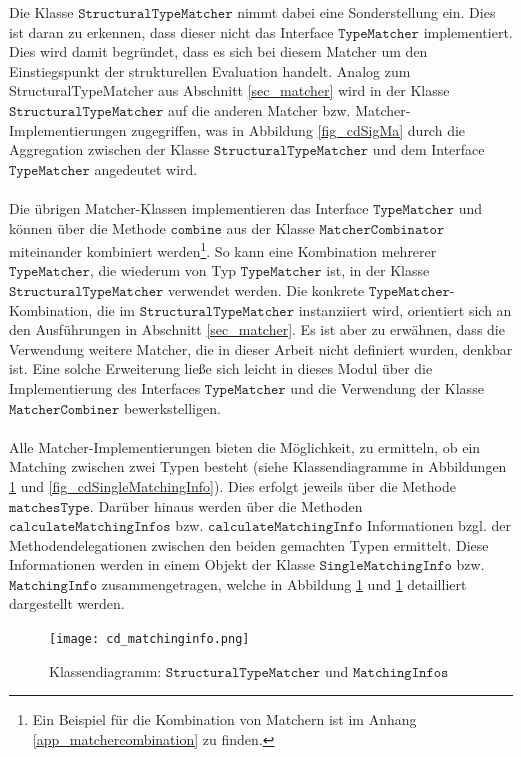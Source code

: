 \noindent
Die Klasse $\texttt{StructuralTypeMatcher}$ nimmt dabei eine Sonderstellung ein. Dies ist daran zu erkennen, dass dieser nicht das Interface $\texttt{TypeMatcher}$ implementiert. Dies wird damit begründet, dass es sich bei diesem Matcher um den Einstiegspunkt der strukturellen Evaluation handelt. Analog zum StructuralTypeMatcher aus Abschnitt \ref{sec_matcher} wird in der Klasse $\texttt{StructuralTypeMatcher}$ auf die anderen Matcher bzw. Matcher-Implementierungen zugegriffen, was in Abbildung \ref{fig_cdSigMa} durch die Aggregation zwischen der Klasse $\texttt{StructuralTypeMatcher}$ und dem Interface $\texttt{TypeMatcher}$ angedeutet wird.
\\\\
Die übrigen Matcher-Klassen implementieren das Interface $\texttt{TypeMatcher}$ und können über die Methode $\texttt{combine}$ aus der Klasse $\texttt{MatcherCombinator}$ miteinander kombiniert werden\footnote{Ein Beispiel für die Kombination von Matchern ist im Anhang \ref{app_matchercombination} zu finden.}. 
So kann eine Kombination mehrerer $\texttt{TypeMatcher}$, die wiederum von Typ $\texttt{TypeMatcher}$ ist, in der Klasse $\texttt{StructuralTypeMatcher}$ verwendet werden. Die konkrete $\texttt{TypeMatcher}$-Kombination, die im $\texttt{StructuralTypeMatcher}$ instanziiert wird, orientiert sich an den Ausführungen in Abschnitt \ref{sec_matcher}. Es ist aber zu erwähnen, dass die Verwendung weitere Matcher, die in dieser Arbeit nicht definiert wurden, denkbar ist. Eine solche Erweiterung ließe sich leicht in dieses Modul über die Implementierung des Interfaces $\texttt{TypeMatcher}$ und die Verwendung der Klasse $\texttt{MatcherCombiner}$ bewerkstelligen.
\\\\
Alle Matcher-Implementierungen bieten die Möglichkeit, zu ermitteln, ob ein Matching zwischen zwei Typen besteht (siehe Klassendiagramme in Abbildungen \ref{fig_cdMatchingInfo} und \ref{fig_cdSingleMatchingInfo}). Dies erfolgt jeweils über die Methode $\texttt{matchesType}$. Darüber hinaus werden über die Methoden $\texttt{calculateMatchingInfos}$ bzw. $\texttt{calculateMatchingInfo}$ Informationen bzgl. der Methodendelegationen zwischen den beiden gemachten Typen ermittelt. Diese Informationen werden in einem Objekt der Klasse $\texttt{SingleMatchingInfo}$ bzw. $\texttt{MatchingInfo}$ zusammengetragen, welche in Abbildung \ref{fig_cdMatchingInfo} und \ref{fig_cdMatchingInfo} detailliert dargestellt werden.
\begin{figure}[h!]
\texttt{[image: cd\_matchinginfo.png]}
\caption{Klassendiagramm: $\texttt{StructuralTypeMatcher}$ und $\texttt{MatchingInfos}$}
\label{fig_cdMatchingInfo}
\end{figure}
